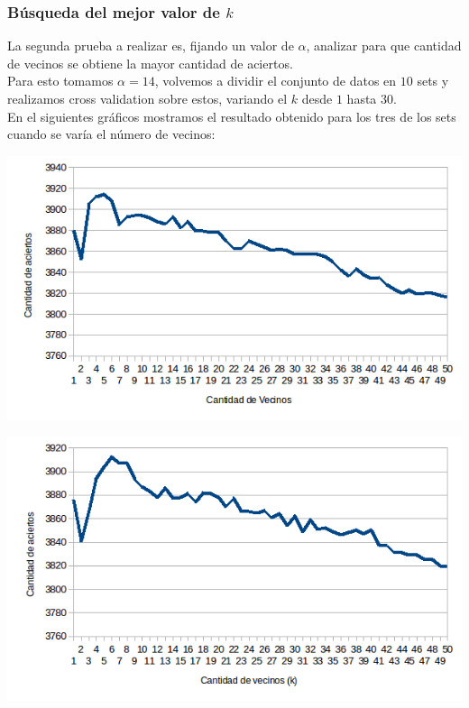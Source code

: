 \subsubsection{Búsqueda del mejor valor de $k$}

La segunda prueba a realizar es, fijando un valor de $\alpha$, analizar para que cantidad de vecinos se obtiene la mayor cantidad de aciertos.
\\
Para esto tomamos $\alpha = 14$, volvemos a dividir el conjunto de datos en $10$ sets y realizamos cross validation sobre estos, variando el $k$ desde $1$ hasta $30$.
\\
En el siguientes gráficos mostramos el resultado obtenido para los tres de los sets cuando se varía el número de vecinos:
\begin{center}
\includegraphics[scale=0.6]{nuevosResultados/pca/k/1.png}\\
\end{center}
\begin{center}
\includegraphics[scale=0.6]{nuevosResultados/pca/k/2.png}\\
\end{center}
